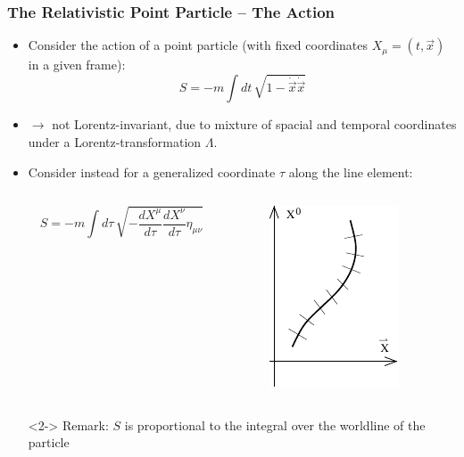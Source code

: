 \documentclass[aspectratio=169]{beamer}
\begin{document}
	\begin{frame}
		\frametitle{The Relativistic Point Particle -- The Action}
		\begin{itemize}[]
			\item<1-> Consider the action of a point particle (with fixed coordinates $X_\mu = (t,\vec{x})$ in a given frame):
			\begin{equation*}
				S = -m \int dt \, \sqrt{1-\dot{\vec{x}}\dot{\vec{x}}}
			\end{equation*}
			\item<1->[] $\rightarrow$ not Lorentz-invariant, due to mixture of spacial and temporal coordinates under a Lorentz-transformation $\Lambda$.
			\item[]
			\item<2-> Consider instead for a generalized coordinate $\tau$ along the line element:
			\begin{columns}
				\begin{column}{0.8\textwidth}
					\begin{equation*}
						S = -m \int d\tau \, \sqrt{-\frac{dX^\mu}{d\tau} \frac{dX^\nu}{d\tau}\eta_{\mu\nu}}
					\end{equation*}
				\end{column}
				\begin{column}{0.2\textwidth}
					\begin{figure}
						\includegraphics[width=0.5\linewidth]{res/TongP17_graph}
					\end{figure}
				\end{column}
			\end{columns}
			\item[]<2-> Remark: $S$ is proportional to the integral over the worldline of the particle
		\end{itemize}
	\end{frame}
\end{document}
